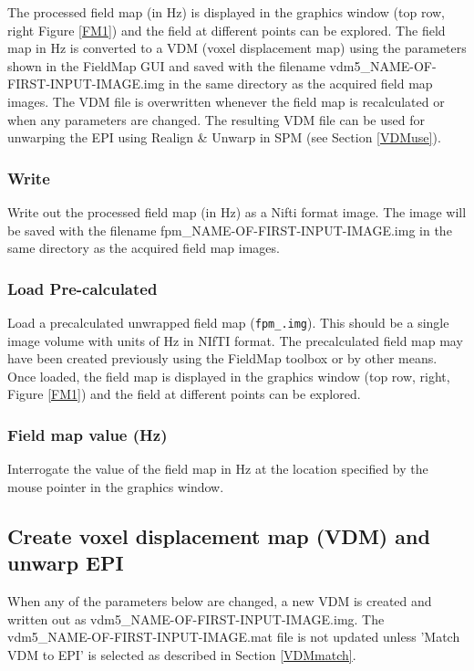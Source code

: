 The processed field map (in Hz) is displayed in the graphics window (top row, right Figure \ref{FM1}) and the field at different points can be explored. The field map in Hz is converted to a VDM (voxel displacement map) using the parameters shown in the FieldMap GUI and saved with the filename vdm5\_NAME-OF-FIRST-INPUT-IMAGE.img in the same directory as the acquired field map images. The VDM file is overwritten whenever the field map is recalculated or when any parameters are changed. The resulting VDM file can be used for unwarping the EPI using Realign \& Unwarp in SPM (see Section \ref{VDMuse}).

\subsubsection{Write}
Write out the processed field map (in Hz) as a Nifti format image. The image will be saved with the filename fpm\_NAME-OF-FIRST-INPUT-IMAGE.img in the same directory as the acquired field map images.

\subsubsection{Load Pre-calculated}
Load a precalculated unwrapped field map (\texttt{fpm\_\*.img}). This should be a single image volume with units of Hz in NIfTI format. The precalculated field map may have been created previously using the FieldMap toolbox or by other means. Once loaded, the field map is displayed in the graphics window (top row, right, Figure \ref{FM1}) and the field at different points can be explored.

\subsubsection{Field map value (Hz)}
Interrogate the value of the field map in Hz at the location specified by the mouse pointer in the graphics window.

\subsection{Create voxel displacement map (VDM) and unwarp EPI}

When any of the parameters below are changed, a new VDM is created and written out as vdm5\_NAME-OF-FIRST-INPUT-IMAGE.img. The vdm5\_NAME-OF-FIRST-INPUT-IMAGE.mat file is not updated unless 'Match VDM to EPI' is selected as described in Section \ref{VDMmatch}.

